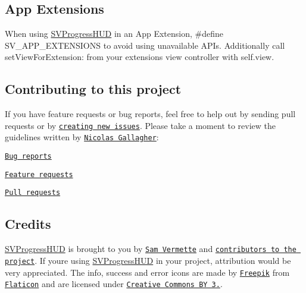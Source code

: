 \subsection*{App Extensions}

When using {\ttfamily \mbox{\hyperlink{interface_s_v_progress_h_u_d}{S\+V\+Progress\+H\+UD}}} in an App Extension, \#define S\+V\+\_\+\+A\+P\+P\+\_\+\+E\+X\+T\+E\+N\+S\+I\+O\+NS to avoid using unavailable A\+P\+Is. Additionally call {\ttfamily set\+View\+For\+Extension\+:} from your extensions view controller with {\ttfamily self.\+view}.

\subsection*{Contributing to this project}

If you have feature requests or bug reports, feel free to help out by sending pull requests or by \href{https://github.com/samvermette/SVProgressHUD/issues/new}{\tt creating new issues}. Please take a moment to review the guidelines written by \href{https://github.com/necolas/}{\tt Nicolas Gallagher}\+:


\begin{DoxyItemize}
\item \href{https://github.com/necolas/issue-guidelines/blob/master/CONTRIBUTING.md#bugs}{\tt Bug reports}
\item \href{https://github.com/necolas/issue-guidelines/blob/master/CONTRIBUTING.md#features}{\tt Feature requests}
\item \href{https://github.com/necolas/issue-guidelines/blob/master/CONTRIBUTING.md#pull-requests}{\tt Pull requests}
\end{DoxyItemize}

\subsection*{Credits}

{\ttfamily \mbox{\hyperlink{interface_s_v_progress_h_u_d}{S\+V\+Progress\+H\+UD}}} is brought to you by \href{http://samvermette.com}{\tt Sam Vermette} and \href{https://github.com/samvermette/SVProgressHUD/contributors}{\tt contributors to the project}. If you\textquotesingle{}re using {\ttfamily \mbox{\hyperlink{interface_s_v_progress_h_u_d}{S\+V\+Progress\+H\+UD}}} in your project, attribution would be very appreciated. The info, success and error icons are made by \href{http://www.freepik.com}{\tt Freepik} from \href{www.flaticon.com}{\tt Flaticon} and are licensed under \href{http://creativecommons.org/licenses/by/3.0/}{\tt Creative Commons BY 3.}. 